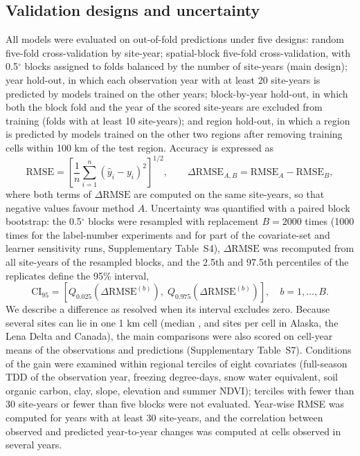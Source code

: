 \subsection{Validation designs and uncertainty}
All models were evaluated on out-of-fold predictions under five designs\cite{Roberts2017,Ploton2020}: random five-fold cross-validation by site-year; spatial-block five-fold cross-validation, with 0.5$^\circ$ blocks assigned to folds balanced by the number of site-years (main design); year hold-out, in which each observation year with at least 20 site-years is predicted by models trained on the other years; block-by-year hold-out, in which both the block fold and the year of the scored site-years are excluded from training (folds with at least 10 site-years); and region hold-out, in which a region is predicted by models trained on the other two regions after removing training cells within 100 km of the test region. Accuracy is expressed as
\begin{equation}
\mathrm{RMSE} = \left[ \frac{1}{n} \sum_{i=1}^{n} \left( \hat{y}_i - y_i \right)^{2} \right]^{1/2}, \qquad \Delta\mathrm{RMSE}_{A,B} = \mathrm{RMSE}_{A} - \mathrm{RMSE}_{B},
\label{eq:rmse}
\end{equation}
where both terms of $\Delta\mathrm{RMSE}$ are computed on the same site-years, so that negative values favour method $A$. Uncertainty was quantified with a paired block bootstrap: the 0.5$^\circ$ blocks were resampled with replacement $B=2000$ times (1000 times for the label-number experiments and for part of the covariate-set and learner sensitivity runs, Supplementary Table~S4), $\Delta\mathrm{RMSE}$ was recomputed from all site-years of the resampled blocks, and the 2.5th and 97.5th percentiles of the replicates define the 95\% interval,
\begin{equation}
\mathrm{CI}_{95} = \left[ Q_{0.025}\!\left( \Delta\mathrm{RMSE}^{(b)} \right),\; Q_{0.975}\!\left( \Delta\mathrm{RMSE}^{(b)} \right) \right], \quad b = 1,\ldots,B.
\label{eq:ci}
\end{equation}
We describe a difference as resolved when its interval excludes zero. Because several sites can lie in one 1 km cell (median \ncySitesMedAk, \ncySitesMedLe{} and \ncySitesMedCa{} sites per cell in Alaska, the Lena Delta and Canada), the main comparisons were also scored on cell-year means of the observations and predictions (Supplementary Table~S7). Conditions of the gain were examined within regional terciles of eight covariates (full-season TDD of the observation year, freezing degree-days, snow water equivalent, soil organic carbon, clay, slope, elevation and summer NDVI); terciles with fewer than 30 site-years or fewer than five blocks were not evaluated. Year-wise RMSE was computed for years with at least 30 site-years, and the correlation between observed and predicted year-to-year changes was computed at cells observed in several years.

